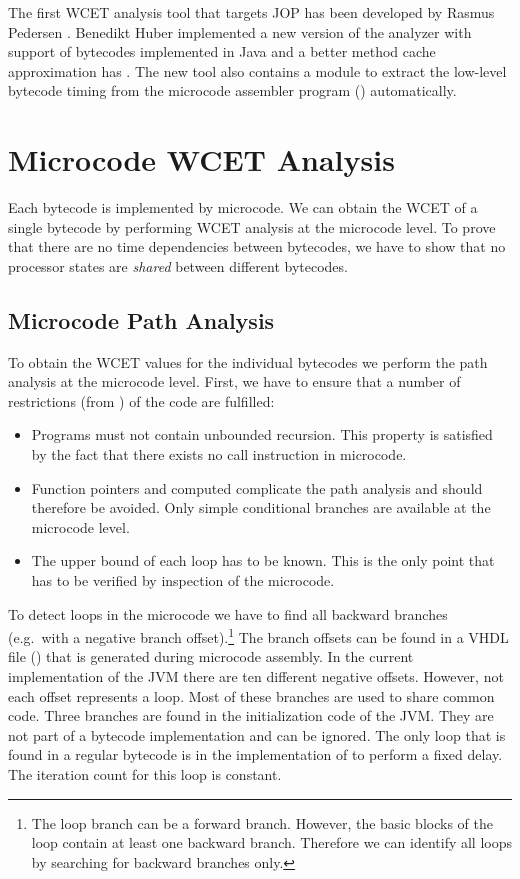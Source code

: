 The first WCET analysis tool that targets JOP has been developed by
Rasmus Pedersen \cite{jop:wcet:jtres06}. Benedikt Huber implemented a
new version of the analyzer with support of bytecodes implemented in
Java and a better method cache approximation has
\cite{jop:wcet:model:checking}. The new tool also contains a module
to extract the low-level bytecode timing from the microcode assembler
program () automatically.

\section{Microcode WCET Analysis}

Each bytecode is implemented by microcode. We can obtain the WCET of
a single bytecode by performing WCET analysis at the microcode level.
To prove that there are no time dependencies between bytecodes, we
have to show that no processor states are \emph{shared} between
different bytecodes.

\subsection{Microcode Path Analysis}

To obtain the WCET values for the individual bytecodes we perform
the path analysis at the microcode level. First, we have to ensure
that a number of restrictions (from \cite{pusch:maxt:jnl}) of the
code are fulfilled:
%
\begin{itemize}
    \item Programs must not contain unbounded recursion. This property
    is satisfied by the fact that there exists no call instruction in
    microcode.
    \item Function pointers and computed  complicate the
    path analysis and should therefore be avoided. Only simple conditional
    branches are available at the microcode level.
    \item The upper bound of each loop has to be known. This is the only
    point that has to be verified by inspection of the microcode.
\end{itemize}
%
To detect loops in the microcode we have to find all backward
branches (e.g.\ with a negative branch offset).\footnote{The loop
branch can be a forward branch. However, the basic blocks of the loop
contain at least one backward branch. Therefore we can identify all
loops by searching for backward branches only.} The branch offsets
can be found in a VHDL file () that is generated
during microcode assembly. In the current implementation of the JVM
there are ten different negative offsets. However, not each offset
represents a loop. Most of these branches are used to share common
code. Three branches are found in the initialization code of the JVM.
They are not part of a bytecode implementation and can be ignored.
The only loop that is found in a regular bytecode is in the
implementation of  to perform a fixed delay. The iteration
count for this loop is constant.

